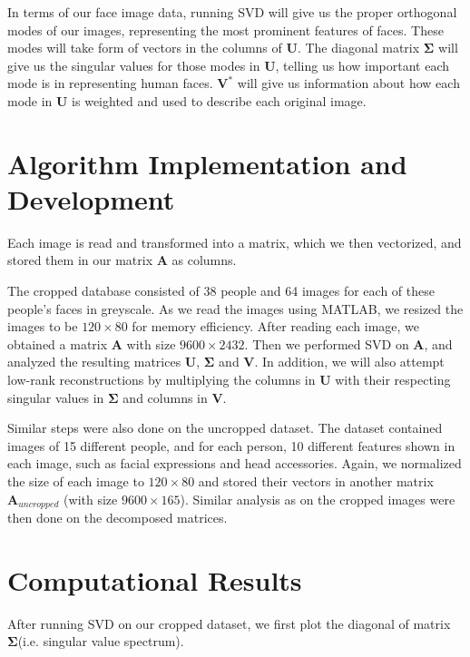 \documentclass[12pt,a4paper]{article}
\begin{document}
In terms of our face image data, running SVD will give us the proper orthogonal modes of our images, representing the most prominent features of faces. These modes will take form of vectors in the columns of $\mathbf{U}$. The diagonal matrix $\mathbf{\Sigma}$ will give us the singular values for those modes in $\mathbf{U}$, telling us how important each mode is in representing human faces. $\mathbf{V}^*$ will give us information about how each mode in $\mathbf{U}$ is weighted and used to describe each original image.


\section{Algorithm Implementation and Development}
Each image is read and transformed into a matrix, which we then vectorized, and stored them in our matrix $\mathbf{A}$ as columns.

The cropped database consisted of 38 people and 64 images for each of these people's faces in greyscale. As we read the images using MATLAB, we resized the images to be $120 \times 80$ for memory efficiency. After reading each image, we obtained a matrix $\mathbf{A}$ with size $9600 \times 2432$. Then we performed SVD on $\mathbf{A}$, and analyzed the resulting matrices $\mathbf{U}$, $\mathbf{\Sigma}$ and $\mathbf{V}$. In addition, we will also attempt low-rank reconstructions by multiplying the columns in $\mathbf{U}$ with their respecting singular values in $\mathbf{\Sigma}$ and columns in $\mathbf{V}$.

Similar steps were also done on the uncropped dataset. The dataset contained images of 15 different people, and for each person, 10 different features shown in each image, such as facial expressions and head accessories. Again, we normalized the size of each image to $120 \times 80$ and stored their vectors in another matrix $\mathbf{A}_{uncropped}$ (with size $ 9600 \times 165$). Similar analysis as on the cropped images were then done on the decomposed matrices. 
\section{Computational Results}
After running SVD on our cropped dataset, we first plot the diagonal of matrix $\mathbf{\Sigma}$(i.e. singular value spectrum). \\
\end{document}
